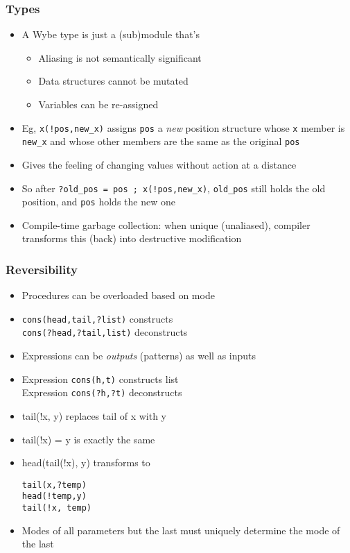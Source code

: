 \documentclass[12pt]{beamer}
\begin{document}
\begin{frame}[fragile]
\frametitle{Types}
\begin{itemize}
\item A Wybe type is just a (sub)module that's 
  \begin{itemize}
  \item Aliasing is not semantically significant
  \item Data structures cannot be mutated
  \item Variables can be re-assigned
  \end{itemize}
\item Eg, \texttt{x(!pos,new\_x)} assigns \texttt{pos}
  a \emph{new} position structure whose \texttt{x} member is \texttt{new\_x} and
  whose other members are the same as the original \texttt{pos}
\item Gives the feeling of changing values without action at a distance
\item So after \texttt{?old\_pos = pos ; x(!pos,new\_x)}, \texttt{old\_pos}
  still holds the old position, and \texttt{pos} holds the new one
\item Compile-time garbage collection:  when unique (unaliased),
  compiler transforms this (back) into destructive modification
\end{itemize}
\end{frame}


\begin{frame}[fragile]
\frametitle{Reversibility}
\begin{itemize}
\item Procedures can be overloaded based on mode
\item \texttt{cons(head,tail,?list)}  constructs \\
\texttt{cons(?head,?tail,list)}  deconstructs \\
\item Expressions can be \emph{outputs} (patterns) as well as inputs
\item Expression \texttt{cons(h,t)} constructs list \\
Expression \texttt{cons(?h,?t)} deconstructs
\item tail(!x, y) replaces tail of x with y
\item tail(!x) = y is exactly the same
\item head(tail(!x), y) \quad transforms to \quad
  \begin{minipage}[c]{0.4\linewidth}
  \texttt{tail(x,?temp)} \\
  \texttt{head(!temp,y)} \\
  \texttt{tail(!x, temp)}
  \end{minipage}
\item Modes of all parameters but the last must uniquely determine the
  mode of the last
\end{itemize}
\end{frame}
\end{document}
